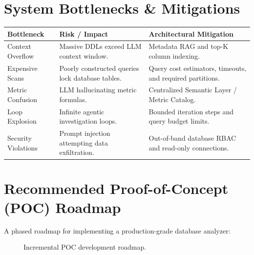 \documentclass[11pt,a4paper]{article}
\begin{document}
\section{System Bottlenecks & Mitigations}

\begin{longtable}{p{} p{} p{}}
\toprule
\textbf{Bottleneck} & \textbf{Risk / Impact} & \textbf{Architectural Mitigation}\\
\midrule
Context Overflow & Massive DDLs exceed LLM context window. & Metadata RAG and top-K column indexing.\\
Expensive Scans & Poorly constructed queries lock database tables. & Query cost estimators, timeouts, and required partitions.\\
Metric Confusion & LLM hallucinating metric formulas. & Centralized Semantic Layer / Metric Catalog.\\
Loop Explosion & Infinite agentic investigation loops. & Bounded iteration steps and query budget limits.\\
Security Violations & Prompt injection attempting data exfiltration. & Out-of-band database RBAC and read-only connections.\\
\bottomrule
\end{longtable}

\section{Recommended Proof-of-Concept (POC) Roadmap}

A phased roadmap for implementing a production-grade database analyzer:

\begin{figure}[H]
\centering
{}
\caption{Incremental POC development roadmap.}
\label{fig:roadmap}
\end{figure}
\end{document}
